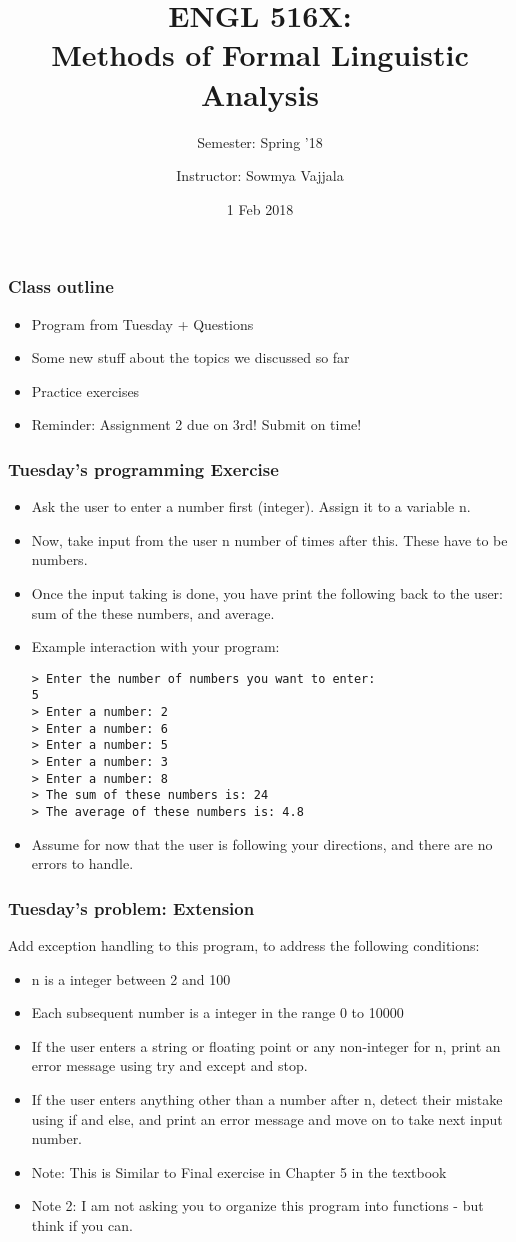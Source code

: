 \documentclass{beamer}
\author[Sowmya Vajjala]{Instructor: Sowmya Vajjala}
\title[ENGL 516X]{ENGL 516X: \\ Methods of Formal Linguistic Analysis}
\subtitle{Semester: Spring '18}
\date{1 Feb 2018}
\institute{Iowa State University, USA}
\begin{document}
\begin{frame}\titlepage
\end{frame}

\begin{frame}%
\frametitle{Class outline}
\begin{itemize}
\item Program from Tuesday + Questions
\item Some new stuff about the topics we discussed so far
\item Practice exercises
\item Reminder: Assignment 2 due on 3rd! Submit on time!
\end{itemize}
\end{frame} %

\begin{frame}[fragile]
\frametitle{Tuesday's programming Exercise}
\begin{itemize}
\item Ask the user to enter a number first (integer). Assign it to a variable n.
\item Now, take input from the user n number of times after this. These have to be numbers.
\item Once the input taking is done, you have print the following back to the user: sum of the these numbers, and average. 
\item Example interaction with your program:
\tiny
\begin{verbatim}
> Enter the number of numbers you want to enter: 
5
> Enter a number: 2
> Enter a number: 6
> Enter a number: 5
> Enter a number: 3
> Enter a number: 8
> The sum of these numbers is: 24
> The average of these numbers is: 4.8
\end{verbatim}
\small \item Assume for now that the user is following your directions, and there are no errors to handle.
\end{itemize}
\end{frame}

\begin{frame}
\frametitle{Tuesday's problem: Extension}
Add exception handling to this program, to address the following conditions:
\begin{itemize}
\item n is a integer between 2 and 100
\item Each subsequent number is a integer in the range 0 to 10000
\item If the user enters a string or floating point or any non-integer for n, print an error message using try and except and stop.
\item If the user enters anything other than a number after n, detect their mistake using if and else, and print an error message and move on to take next input number.
\item Note: This is Similar to Final exercise in Chapter 5 in the textbook
\item Note 2: I am not asking you to organize this program into functions - but think if you can. 
\end{itemize}
\end{frame}
\end{document}
